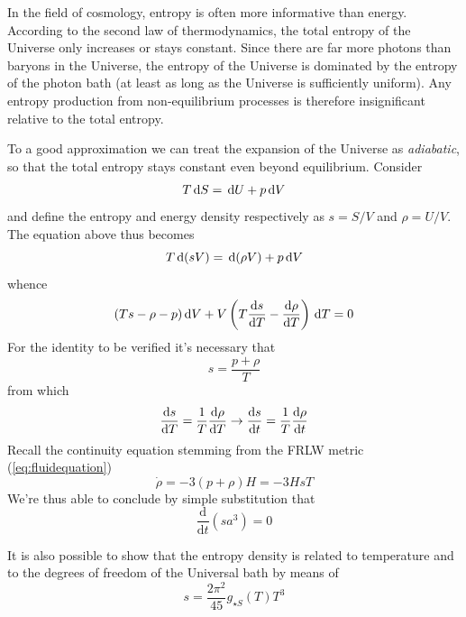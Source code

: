 In the field of cosmology, entropy is often more informative than energy. According to the second law of thermodynamics, the total entropy of the Universe only increases or stays constant. Since there are far more photons than baryons in the Universe, the entropy of the Universe is dominated by the entropy of the photon bath (at least as long as the Universe is sufficiently uniform). Any entropy production from non-equilibrium processes is therefore insignificant relative to the total entropy. 
\par To a good approximation we can treat the expansion of the Universe as \emph{adiabatic}, so that the total entropy stays constant even beyond equilibrium. Consider
\begin{equation}
    T\,\text{d}S = \,\text{d}U + p\,\text{d}V
\end{equation}
and define the entropy and energy density respectively as $s = S/V$ and $\rho = U/V$. The equation above thus becomes
\begin{equation}
    T\,\text{d}(sV) = \,\text{d}(\rho V) + p\,\text{d}V
\end{equation}
whence 
\begin{equation}
    (Ts - \rho - p)\,\text{d}V + V\left(T\frac{\text{d}s}{\text{d}T}-\frac{\text{d}\rho}{\text{d}T}\right)\,\text{d}T = 0
\end{equation}
For the identity to be verified it's necessary that 
\begin{equation}
    s = \frac{p+\rho}{T}
\end{equation}
from which 
\begin{equation}
    \frac{\text{d}s}{\text{d}T} = \frac{1}{T}\frac{\text{d}\rho}{\text{d}T} \to \frac{\text{d}s}{\text{d}t} = \frac{1}{T}\frac{\text{d}\rho}{\text{d}t}
\end{equation}
Recall the continuity equation stemming from the FRLW metric (\ref{eq:fluidequation})
\begin{equation}
    \dot{\rho} = -3(p+\rho)H = -3HsT
\end{equation}
We're thus able to conclude by simple substitution that
\begin{equation}
    \boxed{
    \frac{\text{d}}{\text{d}t}(sa^{3}) = 0
    }
    \label{eq:entropy_cons}
\end{equation}
\par It is also possible to show that the entropy density is related to temperature and to the degrees of freedom of the Universal bath by means of 
\begin{equation}
    s = \frac{2\pi^{2}}{45}g_{\star S}(T)T^{3}
    \label{eq:entropydensity}
\end{equation}
